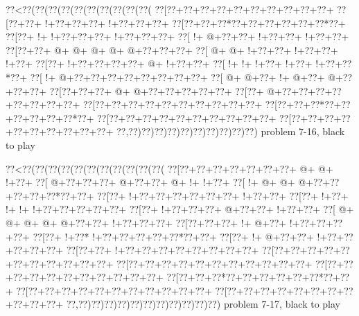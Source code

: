 \vbox{\vbox{\goo
\0??<\0??(\0??(\0??(\0??(\0??(\0??(\0??(\0??(\0??(\0??(
\0??[\0??+\0??+\0??+\0??+\0??+\0??+\0??+\0??+\0??+\0??+
\0??[\0??+\0??+\- !+\0??+\0??+\0??+\- !+\0??+\0??+\0??+
\0??[\0??+\0??+\0??*\0??+\0??+\0??+\0??+\0??+\0??*\0??+
\0??[\0??+\- !+\- !+\0??+\0??+\0??+\- !+\0??+\0??+\0??+
\0??[\- !+\- @+\0??+\0??+\- !+\0??+\0??+\- !+\0??+\0??+
\0??[\0??+\0??+\- @+\- @+\- @+\- @+\- @+\0??+\0??+\0??+
\0??[\- @+\- @+\- !+\0??+\0??+\- !+\0??+\0??+\- !+\0??+
\0??[\0??+\- !+\0??+\0??+\0??+\0??+\- @+\- !+\0??+\0??+
\0??[\- !+\- !+\- !+\0??+\- !+\0??+\- !+\0??+\0??*\0??+
\0??[\- !+\- @+\0??+\0??+\0??+\0??+\0??+\0??+\0??+\0??+
\0??[\- @+\- @+\0??+\- !+\- @+\0??+\- @+\0??+\0??+\0??+
\0??[\0??+\0??+\0??+\- @+\- @+\0??+\0??+\0??+\0??+\0??+
\0??[\0??+\- @+\0??+\0??+\0??+\0??+\0??+\0??+\0??+\0??+
\0??[\0??+\0??+\0??+\0??+\0??+\0??+\0??+\0??+\0??+\0??+
\0??[\0??+\0??+\0??*\0??+\0??+\0??+\0??+\0??+\0??*\0??+
\0??[\0??+\0??+\0??+\0??+\0??+\0??+\0??+\0??+\0??+\0??+
\0??[\0??+\0??+\0??+\0??+\0??+\0??+\0??+\0??+\0??+\0??+
\0??,\0??)\0??)\0??)\0??)\0??)\0??)\0??)\0??)\0??)\0??)
}
\hfil problem 7-16, black to play\hfil\break
}

\vbox{\vbox{\goo
\0??<\0??(\0??(\0??(\0??(\0??(\0??(\0??(\0??(\0??(\0??(\0??(
\0??[\0??+\0??+\0??+\0??+\0??+\0??+\0??+\- @+\- @+\- !+\0??+
\0??[\- @+\0??+\0??+\0??+\- @+\0??+\0??+\- @+\- !+\- !+\0??+
\0??[\- !+\- @+\- @+\- @+\0??+\0??+\0??+\0??+\0??*\0??+\0??+
\0??[\0??+\- !+\0??+\0??+\0??+\0??+\0??+\0??+\- !+\0??+\0??+
\0??[\0??+\- !+\0??+\- !+\- !+\- !+\0??+\0??+\0??+\0??+\0??+
\0??[\0??+\- !+\0??+\0??+\0??+\- @+\0??+\0??+\- !+\0??+\0??+
\0??[\- @+\- @+\- @+\- @+\- @+\0??+\0??+\- !+\0??+\0??+\0??+
\0??[\0??+\0??+\0??+\- !+\- @+\0??+\- !+\0??+\0??+\0??+\0??+
\0??[\0??+\- !+\0??*\- !+\0??+\0??+\0??+\0??+\0??*\0??+\0??+
\0??[\0??+\- !+\- @+\0??+\0??+\- !+\0??+\0??+\0??+\0??+\0??+
\0??[\0??+\0??+\- !+\0??+\0??+\0??+\0??+\0??+\0??+\0??+\0??+
\0??[\0??+\0??+\0??+\0??+\0??+\0??+\0??+\0??+\0??+\0??+\0??+
\0??[\0??+\0??+\0??+\0??+\0??+\0??+\0??+\0??+\0??+\0??+\0??+
\0??[\0??+\0??+\0??+\0??+\0??+\0??+\0??+\0??+\0??+\0??+\0??+
\0??[\0??+\0??+\0??*\0??+\0??+\0??+\0??+\0??+\0??*\0??+\0??+
\0??[\0??+\0??+\0??+\0??+\0??+\0??+\0??+\0??+\0??+\0??+\0??+
\0??[\0??+\0??+\0??+\0??+\0??+\0??+\0??+\0??+\0??+\0??+\0??+
\0??,\0??)\0??)\0??)\0??)\0??)\0??)\0??)\0??)\0??)\0??)\0??)
}
\hfil problem 7-17, black to play\hfil\break
}

